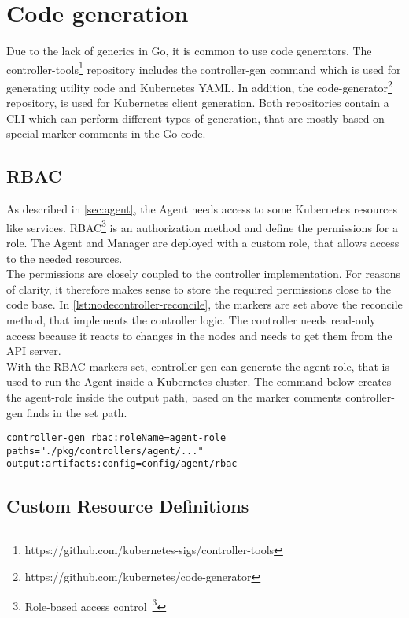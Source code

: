 \section{Code generation}\label{sec:code-generator}

Due to the lack of generics in Go, it is common to use code generators.
The controller-tools\footnote{https://github.com/kubernetes-sigs/controller-tools} repository includes the controller-gen command which is used for generating utility code and Kubernetes YAML.
In addition, the code-generator\footnote{https://github.com/kubernetes/code-generator} repository, is used for Kubernetes client generation.
Both repositories contain a CLI which can perform different types of generation, that are mostly based on special marker comments in the Go code.

\subsection{RBAC}

As described in \autoref{sec:agent}, the Agent needs access to some Kubernetes resources like services.
RBAC\footnote{Role-based access control~\footcite{RBAC}} is an authorization method and define the permissions for a role.
The Agent and Manager are deployed with a custom role, that allows access to the needed resources.
\\
The permissions are closely coupled to the controller implementation.
For reasons of clarity, it therefore makes sense to store the required permissions close to the code base.
In \autoref{lst:nodecontroller-reconcile}, the markers are set above the reconcile method, that implements the controller logic.
The controller needs read-only access because it reacts to changes in the nodes and needs to get them from the API server.
\\
With the RBAC markers set, controller-gen can generate the agent role, that is used to run the Agent inside a Kubernetes cluster.
The command below creates the agent-role inside the output path, based on the marker comments controller-gen finds in the set path.
\\
\begin{lstlisting}[numbers=none, caption={Generate Role YAML files with controller-gen}, label={lst:role-generation}]
controller-gen rbac:roleName=agent-role paths="./pkg/controllers/agent/..." output:artifacts:config=config/agent/rbac
\end{lstlisting}

\subsection{Custom Resource Definitions}

